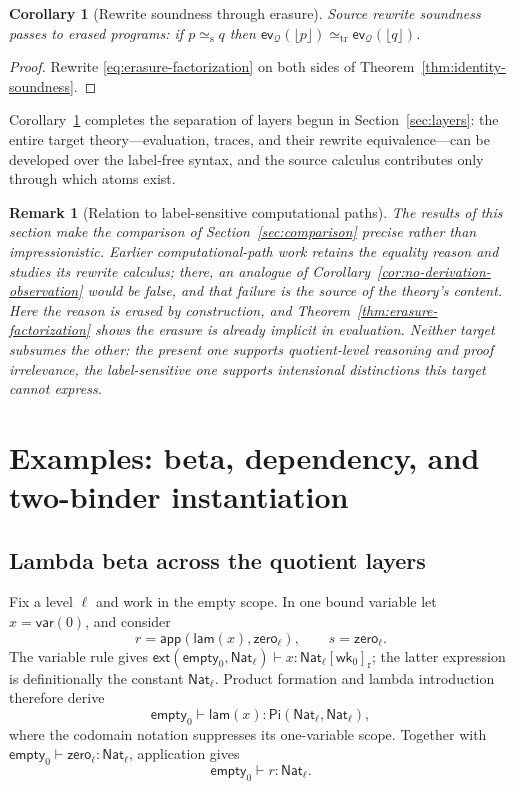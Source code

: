 \documentclass[10pt,reqno]{amsart}
\newtheorem{corollary}[theorem]{Corollary}
\newtheorem{remark}[theorem]{Remark}
\newcommand{\Ext}[2]{\mathsf{ext}(#1,#2)}
\newcommand{\EmptyCtx}{\mathsf{empty}}
\newcommand{\Var}{\mathsf{var}}
\newcommand{\PiTy}{\mathsf{Pi}}
\newcommand{\Lam}{\mathsf{lam}}
\newcommand{\App}{\mathsf{app}}
\newcommand{\NatTy}{\mathsf{Nat}}
\newcommand{\Zero}{\mathsf{zero}}
\newcommand{\TrEq}{\mathrel{\simeq_{\mathrm{tr}}}}
\newcommand{\ev}{\mathsf{ev}}
\newcommand{\srweq}{\mathrel{\simeq_{\mathrm s}}}
\newcommand{\wk}{\mathsf{wk}}
\newcommand{\Q}{\mathcal{Q}}
\begin{document}
\begin{corollary}[Rewrite soundness through erasure]
\label{cor:erased-soundness}
Source rewrite soundness passes to erased programs: if \(p\srweq q\) then
\(\ev_{\Q}(\lfloor p\rfloor)\TrEq\ev_{\Q}(\lfloor q\rfloor)\).
\end{corollary}

\begin{proof}
Rewrite \eqref{eq:erasure-factorization} on both sides of
Theorem~\ref{thm:identity-soundness}.
\end{proof}

Corollary~\ref{cor:erased-soundness} completes the separation of layers begun
in Section~\ref{sec:layers}: the entire target theory---evaluation, traces, and
their rewrite equivalence---can be developed over the label-free syntax, and
the source calculus contributes only through which atoms exist.

\begin{remark}[Relation to label-sensitive computational paths]
\label{rem:erasure-vs-labels}
The results of this section make the comparison of
Section~\ref{sec:comparison} precise rather than impressionistic.  Earlier
computational-path work retains the equality reason and studies its rewrite
calculus; there, an analogue of
Corollary~\ref{cor:no-derivation-observation} would be false, and that failure
is the source of the theory's content.  Here the reason is erased by
construction, and Theorem~\ref{thm:erasure-factorization} shows the erasure is
already implicit in evaluation.  Neither target subsumes the other: the present
one supports quotient-level reasoning and proof irrelevance, the label-sensitive
one supports intensional distinctions this target cannot express.
\end{remark}

\section{Examples: beta, dependency, and two-binder instantiation}
\label{sec:example}

\subsection{Lambda beta across the quotient layers}

Fix a level \(\ell\) and work in the empty scope.  In one bound variable let
\(x=\Var(0)\), and consider
\[
       r=\App(\Lam(x),\Zero_\ell),
       \qquad s=\Zero_\ell.
\tag{10.1}\label{eq:running-redex}
\]
The variable rule gives
\(\Ext{\EmptyCtx_0}{\NatTy_\ell}\vdash
x:\NatTy_\ell[\wk_0]_{\mathrm r}\); the latter expression is
definitionally the constant \(\NatTy_\ell\).  Product formation and lambda
introduction therefore derive
\[
  \EmptyCtx_0\vdash
     \Lam(x):\PiTy(\NatTy_\ell,\NatTy_\ell),
\]
where the codomain notation suppresses its one-variable scope.  Together
with
\(\EmptyCtx_0\vdash\Zero_\ell:\NatTy_\ell\), application gives
\[
                  \EmptyCtx_0\vdash r:\NatTy_\ell.
\]
\end{document}
